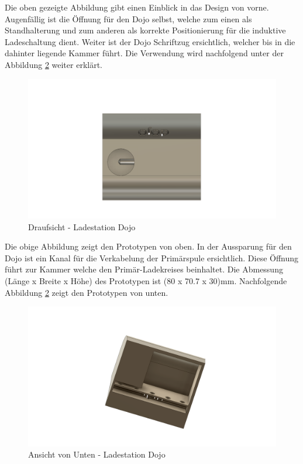 Die oben gezeigte Abbildung gibt einen Einblick in das Design von vorne. Augenfällig ist die Öffnung für den Dojo selbst, welche zum einen als Standhalterung und zum anderen als korrekte Positionierung für die induktive Ladeschaltung dient. Weiter ist der Dojo Schriftzug ersichtlich, welcher bis in die dahinter liegende Kammer führt. Die Verwendung wird nachfolgend unter der Abbildung \ref{fig:Prototyp Down} weiter erklärt. 


\begin{figure}[H]
	\begin{center}
		\includegraphics[width=120mm]{data/DojoLadestation02.png}
		\caption[Prototyp Ladestation Draufsicht]{Draufsicht - Ladestation Dojo} %
		\label{fig:Prototyp Top}
	\end{center}
\end{figure}

Die obige Abbildung  zeigt den Prototypen von oben. In der Aussparung für den Dojo ist ein Kanal für die Verkabelung der Primärspule ersichtlich. Diese Öffnung führt zur Kammer welche den Primär-Ladekreises beinhaltet. Die Abmessung (Länge x Breite x Höhe) des Prototypen ist (80 x 70.7 x 30)mm.
Nachfolgende Abbildung \ref{fig:Prototyp Down} zeigt den Prototypen von unten.

\begin{figure}[H]
	\begin{center}
		\includegraphics[width=120mm]{data/DojoLadestation03.png}
		\caption[Prototyp Ladestation Ansicht von Unten]{Ansicht von Unten - Ladestation Dojo} %
		\label{fig:Prototyp Down}
	\end{center}
\end{figure}

